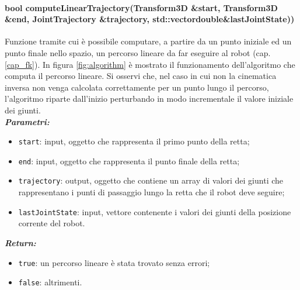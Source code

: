 \paragraph{bool computeLinearTrajectory(Transform3D \&start, Transform3D \&end, JointTrajectory \&trajectory, std::vector\tl double\tr \&lastJointState))}
Funzione tramite cui è possibile computare, a partire da un punto iniziale ed un punto finale nello spazio, un percorso lineare da far eseguire al robot (cap.\ref{cap_fk}). In figura \ref{fig:algorithm} è mostrato il funzionamento dell'algoritmo che computa il percorso lineare. Si osservi che, nel caso in cui non la cinematica inversa non venga calcolata correttamente per un punto lungo il percorso, l'algoritmo riparte dall'inizio perturbando in modo incrementale il valore iniziale dei giunti. \\
\textbf{\textit{Parametri:}}
\begin{itemize}
	\item \texttt{start}: input, oggetto che rappresenta il primo punto della retta;
	\item \texttt{end}: input, oggetto che rappresenta il punto finale della retta;
	\item \texttt{trajectory}: output, oggetto che contiene un array di valori dei giunti che rappresentano i punti di passaggio lungo la retta che il robot deve seguire;
	\item \texttt{lastJointState}: input, vettore contenente i valori dei giunti della posizione corrente del robot. 
\end{itemize}
\textbf{\textit{Return:}}
\begin{itemize}
	\item \texttt{true}: un percorso lineare è stata trovato senza errori;
	\item \texttt{false}: altrimenti.
\end{itemize}


